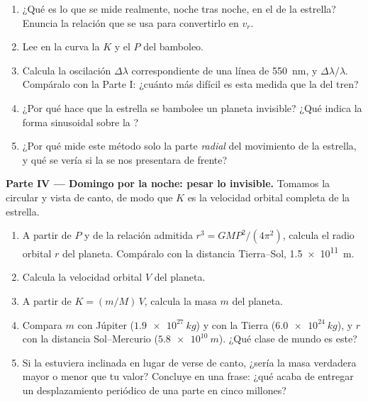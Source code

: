 \begin{problem}
\begin{enumerate}[resume]
  \item ¿Qué es lo que se mide realmente, noche tras noche, en el
        \emph{} de la estrella? Enuncia la relación que se usa
        para convertirlo en $v_r$.
  \item Lee en la curva la  $K$ y el  $P$ del bamboleo.
  \item Calcula la oscilación $\Delta\lambda$ correspondiente de una
        línea de \qty{550}{nm}, y $\Delta\lambda/\lambda$. Compáralo con
        la Parte I: ¿cuánto más difícil es esta medida que la del tren?
  \item ¿Por qué hace que la estrella se bambolee un planeta invisible?
        ¿Qué indica la forma sinusoidal sobre la ?
  \item ¿Por qué mide este método solo la parte \emph{radial} del
        movimiento de la estrella, y qué se vería si la  se nos
        presentara de frente?
\end{enumerate}

\medskip
\noindent\textbf{Parte IV --- Domingo por la noche: pesar lo
invisible.}
Tomamos la  circular y vista de canto, de modo que $K$ es la
velocidad orbital completa de la estrella.
\begin{enumerate}[resume]
  \item A partir de $P$ y de la relación admitida
        $r^3 = G M P^2/(4\pi^2)$, calcula el radio orbital $r$ del
        planeta. Compáralo con la distancia Tierra--Sol,
        \qty{1.5e11}{m}.
  \item Calcula la velocidad orbital $V$ del planeta.
  \item A partir de $K = (m/M)\,V$, calcula la masa $m$ del planeta.
  \item Compara $m$ con Júpiter ($\qty{1.9e27}{kg}$) y con la Tierra
        ($\qty{6.0e24}{kg}$), y $r$ con la distancia Sol--Mercurio
        ($\qty{5.8e10}{m}$). ¿Qué clase de mundo es este?
  \item Si la  estuviera inclinada en lugar de verse de canto,
        ¿sería la masa verdadera mayor o menor que tu valor? Concluye en
        una frase: ¿qué acaba de entregar un desplazamiento periódico de
        una parte en cinco millones?
\end{enumerate}
\end{problem}
